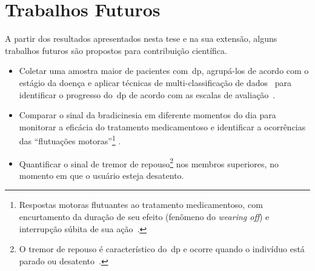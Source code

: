


\section{Trabalhos Futuros}\label{section:trabalhos_futuros}
A partir dos resultados apresentados nesta tese e na sua extensão, alguns trabalhos futuros são propostos para contribuição científica.

\begin{itemize}
	\item Coletar uma amostra maior de pacientes com~\ac{dp}, agrupá-los de acordo com o estágio da doença e aplicar técnicas de multi-classificação de dados~\cite{multisvm2011} para identificar o progresso do~\ac{dp} de acordo com as escalas de avaliação~\cite{goul05}.
	\item Comparar o sinal da bradicinesia em diferente momentos do dia para monitorar a eficácia do tratamento medicamentoso e identificar a ocorrências das ``flutuações motoras''\footnote{Respostas motoras flutuantes ao tratamento medicamentoso, com encurtamento da duração de seu efeito (fenômeno do \textit{wearing off}) e interrupção súbita de sua ação~\cite{protpar010}.} .
	\item Quantificar o sinal de tremor de repouso\footnote{O tremor de repouso é característico do~\ac{dp} e ocorre quando o indivíduo está parado ou desatento~\cite{protpar010}.} nos membros superiores, no momento em que o usuário esteja desatento.
	\end{itemize}


